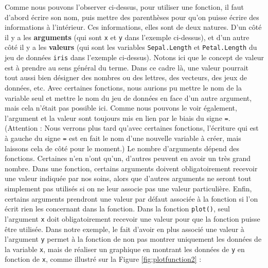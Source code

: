 \documentclass[
]{book}
\newenvironment{Shaded}{\begin{snugshade}}{\end{snugshade}}
\newcommand{\AttributeTok}[1]{\textcolor[rgb]{0.77,0.63,0.00}{#1}}
\newcommand{\FunctionTok}[1]{\textcolor[rgb]{0.00,0.00,0.00}{#1}}
\newcommand{\NormalTok}[1]{#1}
\newcommand{\SpecialCharTok}[1]{\textcolor[rgb]{0.00,0.00,0.00}{#1}}
\begin{document}
Comme nous pouvons l'observer ci-dessus, pour utiliser une fonction, il faut d'abord écrire son nom, puis mettre des parenthèses pour qu'on puisse écrire des informations à l'intérieur. Ces informations, elles sont de deux natures. D'un côté il y a les \textbf{arguments} (qui sont \texttt{x} et \texttt{y} dans l'exemple ci-dessus), et d'un autre côté il y a les \textbf{valeurs} (qui sont les variables \texttt{Sepal.Length} et \texttt{Petal.Length} du jeu de données \texttt{iris} dans l'exemple ci-dessus). Notons ici que le concept de valeur est à prendre au sens général du terme. Dans ce cadre là, une valeur pourrait tout aussi bien désigner des nombres ou des lettres, des vecteurs, des jeux de données, etc. Avec certaines fonctions, nous aurions pu mettre le nom de la variable seul et mettre le nom du jeu de données en face d'un autre argument, mais cela n'était pas possible ici. Comme nous pouvons le voir également, l'argument et la valeur sont toujours mis en lien par le biais du signe \texttt{=}. (Attention : Nous verrons plus tard qu'avec certaines fonctions, l'écriture qui est à gauche du signe \texttt{=} est en fait le nom d'une nouvelle variable à créer, mais laissons cela de côté pour le moment.)
Le nombre d'arguments dépend des fonctions. Certaines n'en n'ont qu'un, d'autres peuvent en avoir un très grand nombre. Dans une fonction, certains arguments doivent obligatoirement recevoir une valeur indiquée par nos soins, alors que d'autres arguments ne seront tout simplement pas utilisés si on ne leur associe pas une valeur particulière. Enfin, certains arguments prendront une valeur par défaut associée à la fonction si l'on écrit rien les concernant dans la fonction. Dans la fonction \texttt{plot()}, seul l'argument \texttt{x} doit obligatoirement recevoir une valeur pour que la fonction puisse être utilisée. Dans notre exemple, le fait d'avoir en plus associé une valeur à l'argument \texttt{y} permet à la fonction de non pas montrer uniquement les données de la variable \texttt{x}, mais de réaliser un graphique en montrant les données de \texttt{y} en fonction de \texttt{x}, comme illustré sur la Figure \ref{fig:plotfunction2} :

\begin{Shaded}
\end{Shaded}
\end{document}
